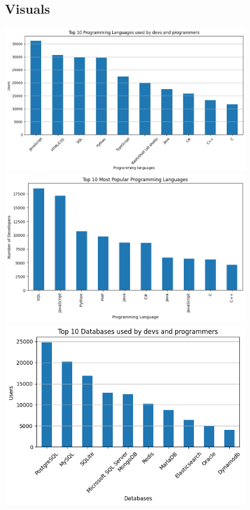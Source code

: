 \documentclass[12pt,a4paper]{article}
\begin{document}
\subsection*{Visuals}
\includegraphics[width=0.8\textwidth]{images/top10-2024.jpg} \\
\includegraphics[width=0.8\textwidth]{images/top10-2017.png} \\
\includegraphics[width=0.8\textwidth]{images/top10-2024db.png} \\
\end{document}
